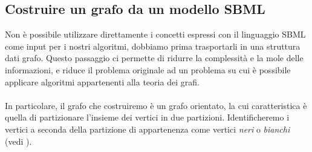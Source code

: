 \subsection{Costruire un grafo da un modello SBML}

Non \`e possibile utilizzare direttamente i concetti espressi con il
linguaggio SBML come input per i nostri algoritmi, dobbiamo prima
trasportarli in una struttura dati grafo. Questo passaggio ci permette
di ridurre la complessit\`a e la mole delle informazioni, e riduce il
problema originale ad un problema su cui \`e possibile applicare
algoritmi appartenenti alla teoria dei grafi.
\\\\
In particolare, il grafo che costruiremo \`e un grafo orientato, la
cui caratteristica \`e quella di partizionare l'insieme dei vertici in
due partizioni. Identificheremo i vertici a seconda della partizione
di appartenenza come vertici \emph{neri} o \emph{bianchi} (vedi
\cite{tellingStories}).

